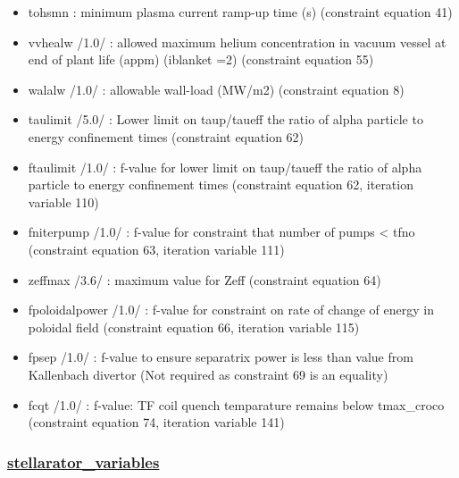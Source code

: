\documentclass[]{article}
\begin{document}
\begin{itemize}
\item
  tohsmn : minimum plasma current ramp-up time (s) (constraint equation
  41)
\item
  vvhealw /1.0/ : allowed maximum helium concentration in vacuum vessel
  at end of plant life (appm) (iblanket =2) (constraint equation 55)
\item
  walalw /1.0/ : allowable wall-load (MW/m2) (constraint equation 8)
\item
  taulimit /5.0/ : Lower limit on taup/taueff the ratio of alpha
  particle to energy confinement times (constraint equation 62)
\item
  ftaulimit /1.0/ : f-value for lower limit on taup/taueff the ratio of
  alpha particle to energy confinement times (constraint equation 62,
  iteration variable 110)
\item
  fniterpump /1.0/ : f-value for constraint that number of pumps
  \textless{} tfno (constraint equation 63, iteration variable 111)
\item
  zeffmax /3.6/ : maximum value for Zeff (constraint equation 64)
\item
  fpoloidalpower /1.0/ : f-value for constraint on rate of change of
  energy in poloidal field (constraint equation 66, iteration variable
  115)
\item
  fpsep /1.0/ : f-value to ensure separatrix power is less than value
  from Kallenbach divertor (Not required as constraint 69 is an
  equality)
\item
  fcqt /1.0/ : f-value: TF coil quench temparature remains below
  tmax\_croco (constraint equation 74, iteration variable 141)
\end{itemize}

\hypertarget{stellarator_variables}{%
\subsubsection{\texorpdfstring{\href{stellarator_variables.html}{stellarator\_variables}}{stellarator\_variables}}\label{stellarator_variables}}
\end{document}
